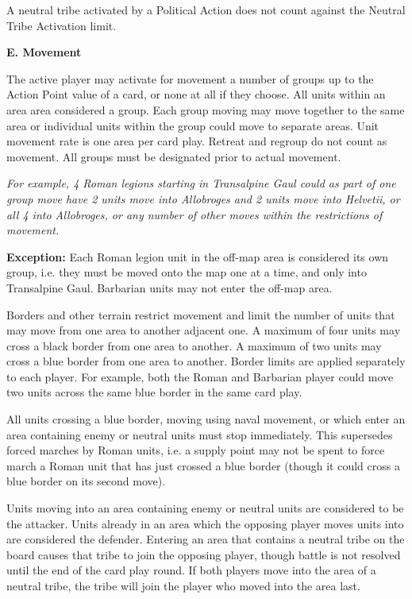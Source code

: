 A neutral tribe activated by a Political Action does not count against the Neutral Tribe Activation limit.

\textbf{E. Movement}
\par
The active player may activate for movement a number of groups up to the Action Point value of a card, or none at all if they choose. All units within an area area considered a group. Each group moving may move together to the same area or individual units within the group could move to separate areas. Unit movement rate is one area per card play. Retreat and regroup do not count as movement. All groups must be designated prior to actual movement.

\textit{For example, 4 Roman legions starting in Transalpine Gaul could as part of one group move have 2 units move into Allobroges and 2 units move into Helvetii, or all 4 into Allobroges, or any number of other moves within the restrictions of movement.}

\textbf{Exception:} Each Roman legion unit in the off-map area is considered its own group, i.e. they must be moved onto the map one at a time, and only into Transalpine Gaul. Barbarian units may not enter the off-map area.
\par
Borders and other terrain restrict movement and limit the number of units that may move from one area to another adjacent one. A maximum of four units may cross a black border from one area to another. A maximum of two units may cross a blue border from one area to another. Border limits are applied separately to each player. For example, both the Roman and Barbarian player could move two units across the same blue border in the same card play.

All units crossing a blue border, moving using naval movement, or which enter an area containing enemy or neutral units must stop immediately. This supersedes forced marches by Roman units, i.e. a supply point may not be spent to force march a Roman unit that has just crossed a blue border (though it could cross a blue border on its second move).

Units moving into an area containing enemy or neutral units are considered to be the attacker. Units already in an area which the opposing player moves units into are considered the defender. Entering an area that contains a neutral tribe on the board causes that tribe to join the opposing player, though battle is not resolved until the end of the card play round. If both players move into the area of a neutral tribe, the tribe will join the player who moved into the area last.

